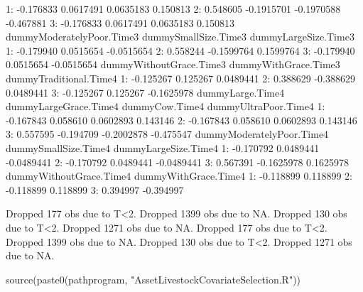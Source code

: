 \begin{Schunk}
\begin{Soutput}
1:        -0.176833             0.0617491      0.0635183             0.150813
2:         0.548605            -0.1915701     -0.1970588            -0.467881
3:        -0.176833             0.0617491      0.0635183             0.150813
   dummyModeratelyPoor.Time3 dummySmallSize.Time3 dummyLargeSize.Time3
1:                 -0.179940            0.0515654           -0.0515654
2:                  0.558244           -0.1599764            0.1599764
3:                 -0.179940            0.0515654           -0.0515654
   dummyWithoutGrace.Time3 dummyWithGrace.Time3 dummyTraditional.Time4
1:               -0.125267             0.125267              0.0489441
2:                0.388629            -0.388629              0.0489441
3:               -0.125267             0.125267             -0.1625978
   dummyLarge.Time4 dummyLargeGrace.Time4 dummyCow.Time4 dummyUltraPoor.Time4
1:        -0.167843              0.058610      0.0602893             0.143146
2:        -0.167843              0.058610      0.0602893             0.143146
3:         0.557595             -0.194709     -0.2002878            -0.475547
   dummyModeratelyPoor.Time4 dummySmallSize.Time4 dummyLargeSize.Time4
1:                 -0.170792            0.0489441           -0.0489441
2:                 -0.170792            0.0489441           -0.0489441
3:                  0.567391           -0.1625978            0.1625978
   dummyWithoutGrace.Time4 dummyWithGrace.Time4
1:               -0.118899             0.118899
2:               -0.118899             0.118899
3:                0.394997            -0.394997
\end{Soutput}
\begin{Soutput}
Dropped 177 obs due to T<2.
Dropped 1399 obs due to NA.
Dropped 130 obs due to T<2.
Dropped 1271 obs due to NA.
Dropped 177 obs due to T<2.
Dropped 1399 obs due to NA.
Dropped 130 obs due to T<2.
Dropped 1271 obs due to NA.
\end{Soutput}
\end{Schunk}

\begin{Schunk}
\begin{Sinput}
source(paste0(pathprogram, "AssetLivestockCovariateSelection.R"))
\end{Sinput}
\end{Schunk}


